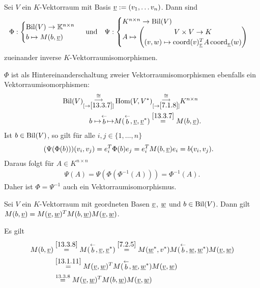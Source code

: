 \documentclass[../../main.tex]{subfiles}
\begin{document}
\begin{sat}\label{13.3.9}
Sei $V$ ein $K$-Vektorraum mit Basis ${\underline v}:=(v_1,\ldots v_n)$. Dann sind\\ 
\begin{align*}
	\Phi:\begin{cases}\Bil(V)\to \K^{n\times n}\\ b\mapsto M(b,\v)\end{cases} \;\text{und}\quad
	\Psi: \begin{cases}K^{n\times n}\to \Bil(V)\\A\mapsto\begin{pmatrix*}V\times V\to K\\ (v,w)\mapsto \co(v)_{\v}^TA\co_\v(w)\end{pmatrix*}\end{cases}
\end{align*}
zueinander inverse $K$-Vektorraumisomorphismen.
\end{sat}
\begin{cproof} $\Phi$ ist als Hintereinanderschaltung zweier Vektorraumisomorphismen ebenfalls ein Vektorraumisomorphismen:
\begin{align*}
\operatorname{Bil}(V)\substack{\cong\\\longrightarrow\\ [\to\ref{13.3.7}]}&\operatorname{Hom}(V,V^*)\substack{\cong\\\longrightarrow\\ [\to\ref{7.1.8}]}K^{n\times n}\\
b\mapsto\stackrel{\leftarrow}{b}\mapsto &M(\stackrel{\leftarrow}{b},{\underline v},{\underline v}^*)\stackrel{\ref{13.3.7}}{=}M(b,{\underline v}).
\end{align*}
Ist $b\in \operatorname{Bil}(V)$, so gilt für alle $i,j\in\{1,\ldots ,n\}$
\begin{align*}
	(\Psi(\Phi(b)))(v_i,v_j)&=e_i^T\Phi(b)e_j=e_i^TM(b,{\underline v})e_i=b(v_i,v_j).
\end{align*}
Daraus folgt für $A\in K^{n\times n}$
\begin{align*}
	\Psi(A)=\Psi(\Phi(\Phi^{-1}(A)))=\Phi^{-1}(A).
\end{align*}
Daher ist $\Phi=\Psi^{-1}$ auch ein Vektorraumisomorphismus.
\end{cproof}

\begin{sat}\label{13.3.10}
Sei $V$ ein $K$-Vektorraum mit geordneten Basen ${\underline v}$, ${\underline w}$ und $b\in \operatorname{Bil}(V)$. Dann gilt $M(b,{\underline v})=M({\underline v},{\underline w})^TM(b,{\underline w})M({\underline v},{\underline w})$.
\end{sat}
\begin{cproof} Es gilt
\begin{align*}
M(b,{\underline v})&\stackrel{\ref{13.3.8}}{=}M(\stackrel{\leftarrow}{b}, {\underline v},{\underline v}^*)\stackrel{\ref{7.2.5}}{=}M({\underline w}^*,v^*)M(\stackrel{\leftarrow}{b},{\underline w},{\underline w}^*)M({\underline v},{\underline w})\\
&\stackrel{\ref{13.1.11}}{=}M({\underline v},{\underline w})^TM(\stackrel{\leftarrow}{b},{\underline w},{\underline w}^*)M({\underline v},{\underline w})\\
&\stackrel{13.3.8}{=}M({\underline v},{\underline w})^TM(b,{\underline w})M({\underline v},{\underline w})
\end{align*}
\end{cproof}
\end{document}
